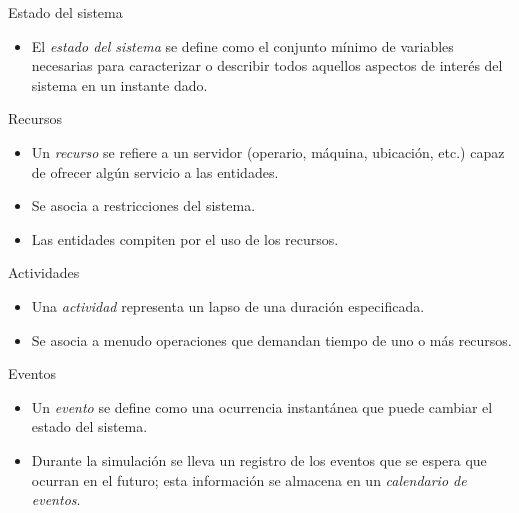 \begin{frame}{Estado del sistema}
    \begin{itemize}
        \item El \textit{estado del sistema} se define como el conjunto mínimo de variables necesarias para caracterizar o describir todos aquellos aspectos de interés del sistema en un instante dado.
        
    \end{itemize}
\end{frame}

\begin{frame}{Recursos}
    \begin{itemize}
        \item Un \textit{recurso} se refiere a un servidor (operario, máquina, ubicación, etc.) capaz de ofrecer algún servicio a las entidades.
        \item Se asocia a restricciones del sistema.
        \item Las entidades compiten por el uso de los recursos. 
    \end{itemize}
\end{frame}

\begin{frame}{Actividades}
    \begin{itemize}
        \item Una \textit{actividad} representa un lapso de una duración especificada.
        \item Se asocia a menudo operaciones que demandan tiempo de uno o más recursos.
    \end{itemize}
\end{frame}



\begin{frame}{Eventos}
    \begin{itemize}
        \item Un \textit{evento} se define como una ocurrencia instantánea que puede cambiar el estado del sistema.
        
        \item Durante la simulación se lleva un registro de los eventos que se espera que ocurran en el futuro; esta información se almacena en un \textit{calendario de eventos}.%

    \end{itemize}
\end{frame}

